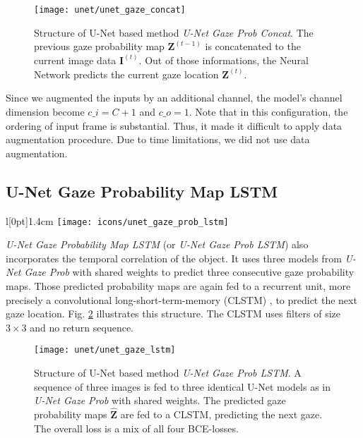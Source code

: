 \begin{figure}[htbp]
  \centering
  \texttt{[image: unet/unet\_gaze\_concat]}
  \caption[Structure of U-Net Gaze Prob Concat]{Structure of U-Net based method \textit{U-Net Gaze Prob Concat}. The previous gaze probability map $\boldsymbol{Z}^{(t-1)}$ is concatenated to the current image data $\boldsymbol{I}^{(t)}$. Out of those informations, the Neural Network predicts the current gaze location $\boldsymbol{Z}^{(t)}$.}
  \label{fig:unet_gaze_concat}
\end{figure}

Since we augmented the inputs by an additional channel, the model's channel dimension become $c\_i=C+1$ and $c\_o=1$. Note that in this configuration, the ordering of input frame is substantial. Thus, it made it difficult to apply data augmentation procedure. Due to time limitations, we did not use data augmentation.

\subsection{U-Net Gaze Probability Map LSTM} \label{ch:unet_gaze_prob_lstm}
\begingroup
\setlength\intextsep{0pt}
\begin{wrapfigure}[4]{l}[0pt]{1.4cm}
\texttt{[image: icons/unet\_gaze\_prob\_lstm]}
\end{wrapfigure}

\textit{U-Net Gaze Probability Map LSTM} (or \textit{U-Net Gaze Prob LSTM}) also incorporates the temporal correlation of the object. It uses three models from \textit{U-Net Gaze Prob} with shared weights to predict three consecutive gaze probability maps. Those predicted probability maps are again fed to a recurrent unit, more precisely a convolutional long-short-term-memory (CLSTM) \cite{shi15}, to predict the next gaze location. Fig. \ref{fig:unet_gaze_lstm} illustrates this structure. The CLSTM uses filters of size $3 \times 3$ and no return sequence.

\endgroup

\begin{figure}[htbp]
  \centering
  \texttt{[image: unet/unet\_gaze\_lstm]}
  \caption[Structure of U-Net Gaze Prob Map LSTM]{Structure of U-Net based method \textit{U-Net Gaze Prob LSTM}. A sequence of three images is fed to three identical U-Net models as in \textit{U-Net Gaze Prob} with shared weights. The predicted gaze probability maps $\boldsymbol{\hat{Z}}$ are fed to a CLSTM, predicting the next gaze. The overall loss is a mix of all four BCE-losses.}
  \label{fig:unet_gaze_lstm}
\end{figure}

